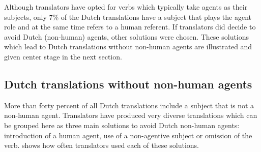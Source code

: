 \documentclass[output=paper]{LSP/langsci}
\begin{document}



Although translators have opted for verbs which typically take agents as their subjects, only 7\% of the Dutch translations have a subject that plays the agent role and at the same time refers to a human referent. If translators did decide to avoid Dutch (non-human) agents, other solutions were chosen. These solutions which lead to Dutch translations without non-human agents are illustrated and given center stage in the next section.  

\subsection{Dutch translations without non-human agents} \label{sec:5:6:2}
More than forty percent of all Dutch translations include a subject that is not a non-human agent. Translators have produced very diverse translations which can be grouped here as three main solutions to avoid Dutch non-human agents: introduction of a human agent, use of a non-agentive subject or omission of the verb.  shows how often translators used each of these solutions. 
\end{document}
